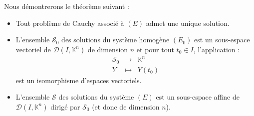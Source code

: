 \documentclass[french]{article}
\newcommand{\K}{\mathbb{K}}
\theoremstyle{plain}
\theoremstyle{definition}
\theoremstyle{remark}
\begin{document}
Nous démontrerons le théorème suivant :

\begin{thm}%
	\begin{itemize}
		\item Tout problème de Cauchy associé à $(E)$ admet une unique solution.
		\item L'ensemble $\mathcal{S}_0$ des solutions du système homogène $(E_0)$ est un sous-espace vectoriel de $\mathcal{D}(I,\K^n)$ de dimension $n$ et pour tout $t_0\in I$, l'application :
		$$\begin{array}{rcl}
			\mathcal{S}_0&\longrightarrow&\K^n\\
			Y&\longmapsto& Y(t_0)
		\end{array}$$ est un isomorphisme d'espaces vectoriels.
		\item L'ensemble $\mathcal{S}$ des solutions du système $(E)$ est un sous-espace affine de $\mathcal{D}(I,\K^n)$ dirigé par $\mathcal{S}_0$ (et donc de dimension $n$).
	\end{itemize}
\end{thm}
\end{document}
